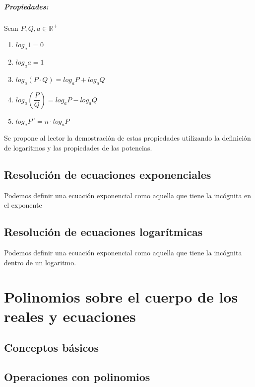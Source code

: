 \paragraph{Propiedades: }
Sean $P,Q,a \in \mathbb{R}^+ $
\begin{enumerate}
\item $log_a 1=0$
\item $log_a a=1$
\item $log_a (P\cdot Q)=log_a P +log_a Q$
\item $log_a \left(\dfrac{P}{Q}\right)=log_a P -log_a Q$
\item $log_a P^n=n\cdot log_a P$
\end{enumerate}

\begin{ejerci}
Se propone al lector la demostración de estas propiedades utilizando la definición de logaritmos y las propiedades de las potencias.
\end{ejerci}
\newpage
\section{Resolución de ecuaciones exponenciales}

\begin{defi}
Podemos definir una ecuación exponencial como aquella que tiene la incógnita en el exponente
\end{defi}
\newpage
\section{Resolución de ecuaciones logarítmicas}
\begin{defi}
Podemos definir una ecuación exponencial como aquella que tiene la incógnita dentro de un logaritmo.
\end{defi}



\chapter{Polinomios sobre el cuerpo de los reales y ecuaciones}

\minitoc

\section{Conceptos básicos}
\section{Operaciones con polinomios}
